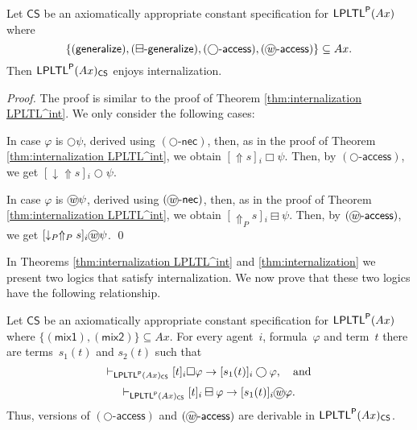 \documentclass[envcountsect,envcountsame,oribibl,orivec]{llncs}
\newcommand*\circled[1]{\tikz[baseline=(char.base)]{
		\node[shape=circle,draw,inner sep=0.4pt] (char) {#1};}}
\newcommand{\limplies}{\rightarrow}
\newcommand{\lnext}{\bigcirc}
\newcommand{\lalways}{\Box}
\newcommand{\lsofar}{\boxminus}
\newcommand{\wprevious}{\circled{\textit{w}}}
\newcommand{\mixaxone}{\ensuremath{(\textsf{mix1})}}
\newcommand{\mixaxtwo}{\ensuremath{(\textsf{mix2})}}
\newcommand{\necrule}{\ensuremath{\textsf{-nec}}}
\newcommand{\nextnecrule}{\ensuremath{(\lnext\necrule)}}
\newcommand{\prevnecrule}{\ensuremath{(\wprevious\necrule)}}
\newcommand{\LPLTLp}{\textsf{LPLTL}^{\sf P}}
\newcommand{\LPLTL}{\textsf{LPLTL}}
\newcommand{\jbox}[1]{\left[#1\right]\!}
\newcommand{\tgeneralize}{\Uparrow}
\newcommand{\tnextaccess}{\downarrow}
\newcommand{\CS}{\textsf{CS}}
\newcommand{\agent}{i}
\newcommand{\generalizeprinciple}{\ensuremath{(\textsf{generalize})}}
\newcommand{\nextaccessprinciple}{\ensuremath{(\lnext\textsf{-access})}}
\newcommand{\pastgeneralizeprinciple}{\ensuremath{(\lsofar\textsf{-generalize})}}
\newcommand{\wprevaccessprinciple}{\ensuremath{(\wprevious\textsf{-access})}}
\renewcommand{\phi}{\varphi}
\begin{document}
\begin{theorem}[Internalization]\label{thm:internalization}
 Let $\CS$ be an axiomatically appropriate constant specification for $\LPLTLp(Ax)$ where 
 \[\{ \generalizeprinciple, \pastgeneralizeprinciple, \nextaccessprinciple, \wprevaccessprinciple \} \subseteq Ax.\]
 Then $\LPLTLp(Ax)_\CS$ enjoys internalization.
\end{theorem}
\begin{proof}
	The proof is similar to the proof of Theorem \ref{thm:internalization LPLTL^int}. We only consider the following cases:
	
	In case $\phi$ is $\lnext \psi$, derived using $\nextnecrule$, then, as in the proof of Theorem \ref{thm:internalization LPLTL^int}, we obtain $\jbox{\tgeneralize s}_\agent \lalways \psi$. Then, by $\nextaccessprinciple$, we get $\jbox{\tnextaccess\tgeneralize s}_\agent \lnext \psi$.


	In case $\phi$ is $\wprevious \psi$, derived using $\prevnecrule$, then, as in the proof of Theorem \ref{thm:internalization LPLTL^int}, we obtain $\jbox{\tgeneralize_P s}_\agent \lsofar \psi$. Then, by $\wprevaccessprinciple$, we get $\jbox{\downarrow_P\tgeneralize_P s}_\agent \wprevious \psi$.
	\qed
\end{proof}

In Theorems \ref{thm:internalization LPLTL^int} and \ref{thm:internalization} we present two logics that satisfy internalization. We now prove that these two logics have the following relationship.

\begin{lemma}
	 Let $\CS$ be an axiomatically appropriate constant specification for $\LPLTLp(Ax)$ where $\{ \mixaxone, \mixaxtwo \} \subseteq Ax.$
	For every agent~$\agent$, formula~$\phi$ and term~$t$ there are terms~$s_1(t)$ and $s_2(t)$ such that
		\[
		\vdash_{\LPLTLp(Ax)_\CS} \jbox{t}_\agent \lalways \phi \limplies \jbox{s_1(t)}_\agent \lnext \phi, \quad \mbox{and}
		\]
		\[
		\vdash_{\LPLTLp(Ax)_\CS} \jbox{t}_\agent \lsofar \phi \limplies \jbox{s_1(t)}_\agent \wprevious \phi.
		\]
		Thus, versions of $\nextaccessprinciple$ and $\wprevaccessprinciple$ are derivable in $\LPLTLp(Ax)_\CS$.
\end{lemma}
\end{document}
